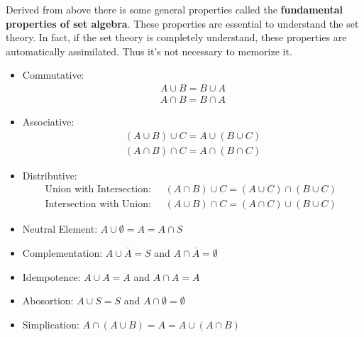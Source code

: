 Derived from above there is some general properties called the
\textbf{fundamental properties of set algebra}. These properties are essential
to understand the set theory. In fact, if the set theory is completely
understand, these properties are automatically assimilated. Thus it's not
necessary to memorize it. 
\begin{itemize}
   \item Commutative: 
   \begin{gather*}
        A \cup B = B \cup A\\
        A \cap B = B \cap A     
   \end{gather*}
   \item Associative: 
   \begin{gather*}
        (A \cup B) \cup C = A \cup (B \cup C)\\
        (A \cap B) \cap C = A \cap (B \cap C)        
   \end{gather*}
   \item Distributive:
   \begin{equation*}
        \text{Union with Intersection:} \quad 
        \begin{gathered}
            (A \cap B)\cup C = (A\cup C) \cap (B \cup C)
        \end{gathered}
    \end{equation*}
    \begin{equation*}
        \text{Intersection with Union:} \quad
        \begin{gathered}
             (A \cup B)\cap C = (A\cap C) \cup (B \cup C)
         \end{gathered}
   \end{equation*}   
   \item Neutral Element: $A \cup \emptyset = A = A \cap S$
   \item Complementation: $A \cup \overline{A} = S$ and $A\cap \overline{A} =
   \emptyset$
   \item Idempotence: $A \cup A = A$ and $A \cap A = A$
   \item Abosortion: $A \cup S = S$ and $A \cap \emptyset = \emptyset$
   \item Simplication: $A \cap (A \cup B) = A = A \cup (A \cap B)$
\end{itemize}


